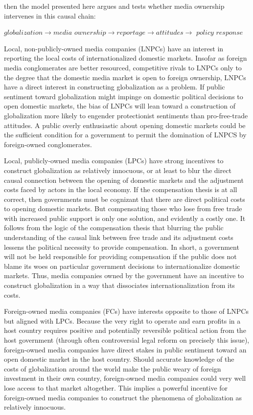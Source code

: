\documentclass[12pt]{report}
\begin{document}
then the model presented here argues and tests whether media ownership intervenes in this causal chain:

\begin{center}
$globalization \rightarrow media$ $ownership \rightarrow reportage \rightarrow
attitudes \rightarrow$ $policy$ $response$
\end{center}

Local, non-publicly-owned media companies (LNPCs) have an interest in reporting the local costs of
internationalized domestic markets. Insofar as foreign media conglomerates are better resourced,
competitive rivals to LNPCs only to the degree that the domestic media market is open to foreign
ownership, LNPCs have a direct interest in constructing globalization as a problem. If public
sentiment toward globalization might impinge on domestic political decisions to open domestic
markets, the bias of LNPCs will lean toward a construction of globalization more likely to engender
protectionist sentiments than pro-free-trade attitudes. A public overly enthusiastic about opening
domestic markets could be the sufficient condition for a government to permit the domination of
LNPCS by foreign-owned conglomerates.

Local, publicly-owned media companies (LPCs) have strong incentives to construct globalization as
relatively innocuous, or at least to blur the direct causal connection between the opening of
domestic markets and the adjustment costs faced by actors in the local economy. If the compensation
thesis is at all correct, then governments must be cognizant that there are direct political costs
to opening domestic markets. But compensating those who lose from free trade with increased public
support is only one solution, and evidently a costly one. It follows from the logic of the
compensation thesis that blurring the public understanding of the causal link between free trade and
its adjustment costs lessens the political necessity to provide compensation. In short, a government
will not be held responsible for providing compensation if the public does not blame its woes on
particular government decisions to internationalize domestic markets. Thus, media companies owned by
the government have an incentive to construct globalization in a way that dissociates
internationalization from its costs.

Foreign-owned media companies (FCs) have interests opposite to those of LNPCs but aligned with LPCs.
Because the very right to operate and earn profits in a host country requires positive and
potentially reversible political action from the host government (through often controversial legal
reform on precisely this issue), foreign-owned media companies have direct stakes in public
sentiment toward an open domestic market in the host country. Should accurate knowledge of the costs
of globalization around the world make the public weary of foreign investment in their own country,
foreign-owned media companies could very well lose access to that market altogether. This implies a
powerful incentive for foreign-owned media companies to construct the phenomena of globalization as
relatively innocuous.
\end{document}
